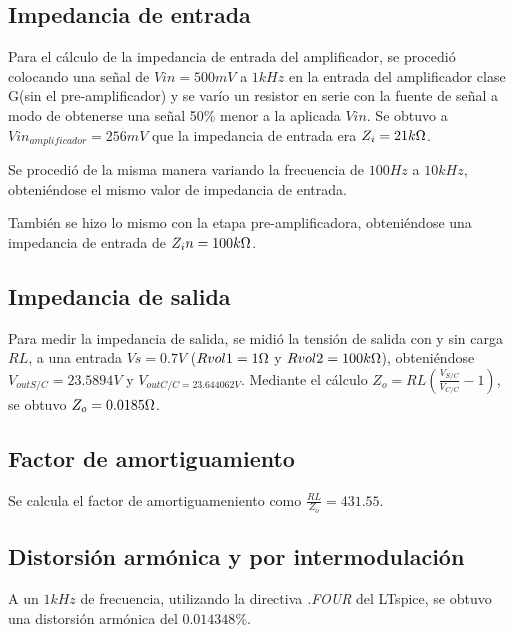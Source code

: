 \subsection{Impedancia de entrada}

\par Para el cálculo de la impedancia de entrada del amplificador, se procedió colocando una señal de $Vin = 500mV$ a $1kHz$ en la entrada del amplificador clase G(sin el pre-amplificador) y se varío un resistor en serie con la fuente de señal a modo de obtenerse una señal 50\% menor a la aplicada $Vin$. Se obtuvo a $Vin_{amplificador} = 256mV$ que la impedancia de entrada era $Z_i = 21k\ohm$.

\par Se procedió de la misma manera variando la frecuencia de $100Hz$ a $10kHz$, obteniéndose el mismo valor de impedancia de entrada.\\

\par También se hizo lo mismo con la etapa pre-amplificadora, obteniéndose una impedancia de entrada de $Z_in =100k\ohm$. \\

\subsection{Impedancia de salida}

\par Para medir la impedancia de salida, se midió la tensión de salida con y sin carga $RL$, a una entrada $Vs = 0.7V$ ($Rvol1 = 1\ohm$ y $Rvol2 = 100k\ohm$), obteniéndose $V_{outS/C} = 23.5894V$ y $V_{outC/C = 23.644062V}$. Mediante el cálculo $Z_o = RL (\frac{V_{S/C}}{V_{C/C}}-1)$, se obtuvo $Z_o = 0.0185\ohm$.\\

\subsection{Factor de amortiguamiento}

\par Se calcula el factor de amortiguameniento como $\frac{RL}{Z_o} = 431.55$.

\subsection{Distorsión armónica y por intermodulación}

\par A un $1kHz$ de frecuencia, utilizando la directiva \textit{.FOUR} del LTspice, se obtuvo una distorsión armónica del $0.014348\%$.

